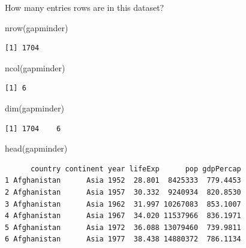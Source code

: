 \documentclass[
  letterpaper,
  DIV=11,
  numbers=noendperiod]{scrartcl}
\newenvironment{Shaded}{\begin{snugshade}}{\end{snugshade}}
\newcommand{\FunctionTok}[1]{\textcolor[rgb]{0.28,0.35,0.67}{#1}}
\newcommand{\NormalTok}[1]{\textcolor[rgb]{0.00,0.23,0.31}{#1}}
\newcommand{\SpecialCharTok}[1]{\textcolor[rgb]{0.37,0.37,0.37}{#1}}
\begin{document}
How many entries rows are in this dataset?

\begin{Shaded}
\begin{Highlighting}[]
\FunctionTok{nrow}\NormalTok{(gapminder)}
\end{Highlighting}
\end{Shaded}

\begin{verbatim}
[1] 1704
\end{verbatim}

\begin{Shaded}
\begin{Highlighting}[]
\FunctionTok{ncol}\NormalTok{(gapminder)}
\end{Highlighting}
\end{Shaded}

\begin{verbatim}
[1] 6
\end{verbatim}

\begin{Shaded}
\begin{Highlighting}[]
\FunctionTok{dim}\NormalTok{(gapminder)}
\end{Highlighting}
\end{Shaded}

\begin{verbatim}
[1] 1704    6
\end{verbatim}

\begin{Shaded}
\begin{Highlighting}[]
\FunctionTok{head}\NormalTok{(gapminder)}
\end{Highlighting}
\end{Shaded}

\begin{verbatim}
      country continent year lifeExp      pop gdpPercap
1 Afghanistan      Asia 1952  28.801  8425333  779.4453
2 Afghanistan      Asia 1957  30.332  9240934  820.8530
3 Afghanistan      Asia 1962  31.997 10267083  853.1007
4 Afghanistan      Asia 1967  34.020 11537966  836.1971
5 Afghanistan      Asia 1972  36.088 13079460  739.9811
6 Afghanistan      Asia 1977  38.438 14880372  786.1134
\end{verbatim}

\begin{Shaded}
\end{Shaded}
\end{document}

